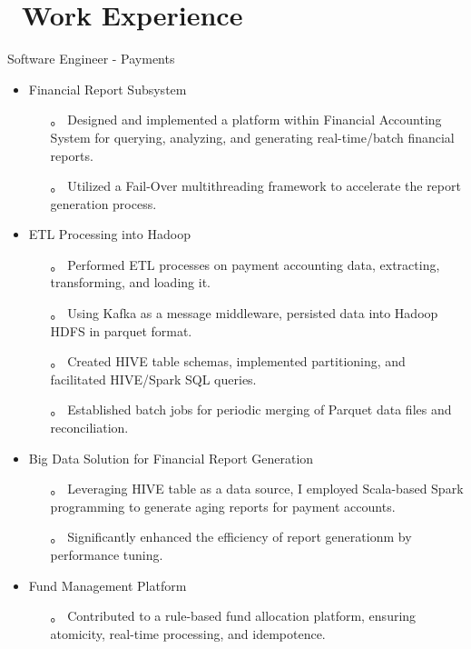 \documentclass{resume}
\begin{document}
\section{\faUsers\ Work Experience}
Software Engineer - Payments
\begin{itemize}
  \item Financial Report Subsystem
  \begin{itemize}
    \item[。] Designed and implemented a platform within Financial Accounting System for querying, analyzing, and generating real-time/batch financial reports.
    \item[。] Utilized a Fail-Over multithreading framework to accelerate the report generation process.
  \end{itemize}

  \item ETL Processing into Hadoop
  \begin{itemize}
    \item[。] Performed ETL processes on payment accounting data, extracting, transforming, and loading it.
    \item[。] Using Kafka as a message middleware, persisted data into Hadoop HDFS in parquet format.
    \item[。] Created HIVE table schemas, implemented partitioning, and facilitated HIVE/Spark SQL queries.
    \item[。] Established batch jobs for periodic merging of Parquet data files and reconciliation.
  \end{itemize}

  \item Big Data Solution for Financial Report Generation
  \begin{itemize}
    \item[。] Leveraging HIVE table as a data source, I employed Scala-based Spark programming to generate aging reports for payment accounts.
    \item[。] Significantly enhanced the efficiency of report generationm by performance tuning.
  \end{itemize}

  \item Fund Management Platform
  \begin{itemize}
    \item[。] Contributed to a rule-based fund allocation platform, ensuring atomicity, real-time processing, and idempotence.
  \end{itemize}


\end{itemize}
\end{document}
